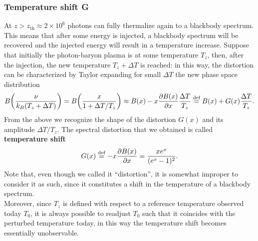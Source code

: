 \subsubsection{Temperature shift G}
At $z>z_\text{th}\approx2\times10^6$ photons can fully thermalize again to a blackbody spectrum. This means that after some energy is injected, a blackbody spectrum will be recovered and the injected energy will result in a temperature increase. Suppose that initially the photon-baryon plasma is at some temperature $T_z$, then, after the injection, the new temperature $T_z+\Delta T$ is reached: in this way, the distortion can be characterized by Taylor expanding for small $\Delta T$ the new phase space distribution 
$$B\bigg(\frac{\nu}{k_B(T_z+\Delta T)}\bigg)=B\bigg(\frac{x}{1+\Delta T/T_z}\bigg)\approx B(x)-x\frac{\partial B(x)}{\partial x}\frac{\Delta T}{T_z}\stackrel{\text{def}}{=} B(x)+G(x)\frac{\Delta T}{T_z}.$$
From the above we recognize the shape of the distortion $G(x)$ and its amplitude $\Delta T/T_z$. The spectral distortion that we obtained is called \textbf{temperature shift}
\begin{equation}
    \label{eq:SD_temperature_shift}
    G(x)\stackrel{\text{def}}{=}-x\frac{\partial B(x)}{\partial x}=\frac{xe^x}{(e^x-1)^2}.
\end{equation}
Note that, even though we called it ``distortion'', it is somewhat improper to consider it as such, since it constitutes a shift in the temperature of a blackbody spectrum.\\ 
Moreover, since $T_z$ is defined with respect to a reference temperature observed today $T_0$, it is always possible to readjust $T_0$ such that it coincides with the perturbed temperature today, in this way the temperature shift becomes essentially unobservable. 

